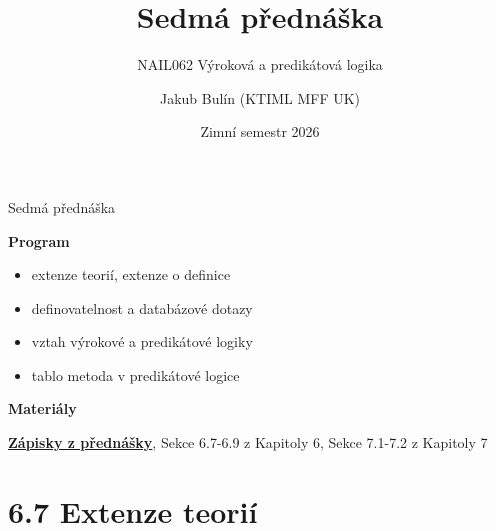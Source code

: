 \documentclass{beamer}
\title{Sedmá přednáška}
\subtitle{NAIL062 Výroková a predikátová logika}
\author{Jakub Bulín (KTIML MFF UK)}
\date{Zimní semestr 2026}
\begin{document}
\maketitle


\begin{frame}{Sedmá přednáška}

    \textbf{Program}
        \begin{itemize}
            \item extenze teorií, extenze o definice
            \item definovatelnost a databázové dotazy
            \item vztah výrokové a predikátové logiky
            \item tablo metoda v predikátové logice
        \end{itemize}

    \textbf{Materiály}

        \href{https://github.com/jbulin-mff-uk/nail062/raw/main/lecture/lecture-notes/lecture-notes.pdf}{\alert{\textbf{Zápisky z přednášky}}}, Sekce 6.7-6.9 z Kapitoly 6, Sekce 7.1-7.2 z Kapitoly 7

\end{frame}


\section{6.7 Extenze teorií}
\end{document}
